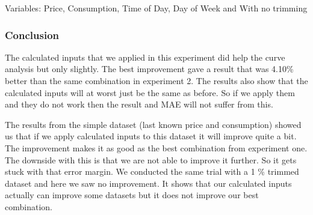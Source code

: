 Variables: Price, Consumption, Time of Day, Day of Week and	With no trimming
\begin{table}[H]
\centering  %
\caption{Scatter text~\cite{singhal2011electricity} with other calculated inputs and 1\% trim} %
\label{table:scatter_text_1p_trim} %
\end{table}

\subsubsection{Conclusion}
The calculated inputs that we applied in this experiment did help the curve analysis but only slightly. The best improvement gave a result that was 4.10\% better than the same combination in experiment 2. The results also show that the calculated inputs will at worst just be the same as before. So if we apply them and they do not work then the result and MAE will not suffer from this.

The results from the simple dataset (last known price and consumption) showed us that if we apply calculated inputs to this dataset it will improve quite a bit. The improvement makes it as good as the best combination from experiment one. The downside with this is that we are not able to improve it further. So it gets stuck with that error margin. We conducted the same trial with a 1 \% trimmed dataset and here we saw no improvement. It shows that our calculated inputs actually can improve some datasets but it does not improve our best combination.

